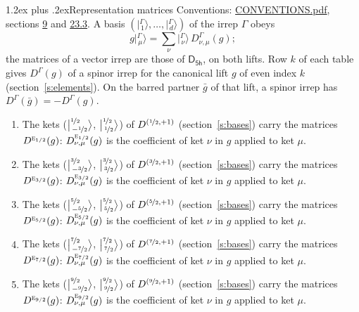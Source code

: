 \documentclass[10pt,a4paper]{article}
\makeatletter
\renewcommand\section{\@startsection{section}{1}{\z@}{-3ex plus -1ex minus -.2ex}%
  {1.2ex plus .2ex}{\normalfont\large\sffamily\bfseries\color{parttitle}}}
\numberwithin{equation}{section}
\newcommand{\grp}[1]{\mathsf{#1}}
\newcommand{\irr}[1]{\text{\normalfont\scshape #1}}
\newcommand{\irrJp}[2]{D^{(#1,#2)}}
\newcommand{\repD}[1]{D^{#1}}
\newcommand{\intx}{\mu}
\newcommand{\jm}[2]{\bigl\lvert{}^{#1}_{\,#2}\bigr\rangle}
\newcommand{\irket}[2]{\bigl\lvert{}^{#1}_{\,#2}\bigr\rangle}
\newcommand{\barred}[1]{\bar{#1}}
\newenvironment{romanlist}{\begin{enumerate}%
\renewcommand{\labelenumi}{(\roman{enumi})}}%
  {\end{enumerate}}
\makeatother
\begin{document}
\section{Representation matrices}\label{s:irrep_matrices}
Conventions: \href{../../CONVENTIONS.pdf}{CONVENTIONS.pdf}, sections \href{../../../rotation/CONVENTIONS.pdf\#conv.9}{9} and \href{../../CONVENTIONS.pdf\#conv.23.3}{23.3}.
\leavevmode\label{n:vector.ket.partner}\label{n:index.partner}\label{n:matrix.irrep}\label{n:index.partner.summed}A basis $(\irket{\Gamma}{1}, \dots, \irket{\Gamma}{d})$ of the irrep $\Gamma$ obeys
\begin{equation}\label{e:partner}g\irket{\Gamma}{\intx} = \sum_\nu \irket{\Gamma}{\nu}\, \repD{\Gamma}_{\nu,\intx}(g);\end{equation}
the matrices of a vector irrep are those of \href{../../../rotation/data/pdf/D5h.pdf}{$\grp{D_{5h}}$}, on both lifts. Row $k$ of each table gives $\repD{\Gamma}(g)$ of a spinor irrep for the canonical lift $g$ of even index $k$ (section~\ref{s:elements}). On the barred partner $\barred{g}$ of that lift, a spinor irrep has $\repD{\Gamma}(\barred{g}) = -\repD{\Gamma}(g)$.
\begin{romanlist}\raggedright
\item The kets ($\jm{\nicefrac{1}{2}}{-\nicefrac{1}{2}}$, $\jm{\nicefrac{1}{2}}{\nicefrac{1}{2}}$) of $\irrJp{\nicefrac{1}{2}}{+1}$ (section~\ref{s:bases}) carry the matrices $\repD{\irr{e}_{1/2}}(g)$: $\repD{\irr{e}_{1/2}}_{\nu,\intx}(g)$ is the coefficient of ket $\nu$ in $g$ applied to ket $\intx$.
\item The kets ($\jm{\nicefrac{3}{2}}{-\nicefrac{3}{2}}$, $\jm{\nicefrac{3}{2}}{\nicefrac{3}{2}}$) of $\irrJp{\nicefrac{3}{2}}{+1}$ (section~\ref{s:bases}) carry the matrices $\repD{\irr{e}_{3/2}}(g)$: $\repD{\irr{e}_{3/2}}_{\nu,\intx}(g)$ is the coefficient of ket $\nu$ in $g$ applied to ket $\intx$.
\item The kets ($\jm{\nicefrac{5}{2}}{-\nicefrac{5}{2}}$, $\jm{\nicefrac{5}{2}}{\nicefrac{5}{2}}$) of $\irrJp{\nicefrac{5}{2}}{+1}$ (section~\ref{s:bases}) carry the matrices $\repD{\irr{e}_{5/2}}(g)$: $\repD{\irr{e}_{5/2}}_{\nu,\intx}(g)$ is the coefficient of ket $\nu$ in $g$ applied to ket $\intx$.
\item The kets ($\jm{\nicefrac{7}{2}}{-\nicefrac{7}{2}}$, $\jm{\nicefrac{7}{2}}{\nicefrac{7}{2}}$) of $\irrJp{\nicefrac{7}{2}}{+1}$ (section~\ref{s:bases}) carry the matrices $\repD{\irr{e}_{7/2}}(g)$: $\repD{\irr{e}_{7/2}}_{\nu,\intx}(g)$ is the coefficient of ket $\nu$ in $g$ applied to ket $\intx$.
\item The kets ($\jm{\nicefrac{9}{2}}{-\nicefrac{9}{2}}$, $\jm{\nicefrac{9}{2}}{\nicefrac{9}{2}}$) of $\irrJp{\nicefrac{9}{2}}{+1}$ (section~\ref{s:bases}) carry the matrices $\repD{\irr{e}_{9/2}}(g)$: $\repD{\irr{e}_{9/2}}_{\nu,\intx}(g)$ is the coefficient of ket $\nu$ in $g$ applied to ket $\intx$.
\end{romanlist}
\end{document}
